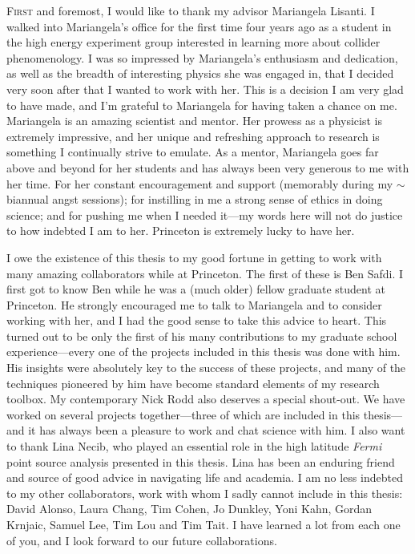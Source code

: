 \lettrine[lines=3]{F}{irst} and foremost, I would like to thank my advisor Mariangela Lisanti. I walked into Mariangela's office for the first time four years ago as a student in the high energy experiment group interested in learning more about collider phenomenology. I was so impressed by Mariangela's enthusiasm and dedication, as well as the breadth of interesting physics she was engaged in, that I decided very soon after that I wanted to work with her. This is a decision I am very glad to have made, and I'm grateful to Mariangela for having taken a chance on me. Mariangela is an amazing scientist and mentor. Her prowess as a physicist is extremely impressive, and her unique and refreshing approach to research is something I continually strive to emulate. As a mentor, Mariangela goes far above and beyond for her students and has always been very generous to me with her time. For her constant encouragement and support (memorably during my $\sim$biannual angst sessions); for instilling in me a strong sense of ethics in doing science; and for pushing me when I needed it---my words here will not do justice to how indebted I am to her. Princeton is extremely lucky to have her.

I owe the existence of this thesis to my good fortune in getting to work with many amazing collaborators while at Princeton. The first of these is Ben Safdi. I first got to know Ben while he was a (much older) fellow graduate student at Princeton. He strongly encouraged me to talk to Mariangela and to consider working with her, and I had the good sense to take this advice to heart. This turned out to be only the first of his many contributions to my graduate school experience---every one of the projects included in this thesis was done with him. His insights were absolutely key to the success of these projects, and many of the techniques pioneered by him have become standard elements of my research toolbox. My contemporary Nick Rodd also deserves a special shout-out. We have worked on several projects together---three of which are included in this thesis---and it has always been a pleasure to work and chat science with him. I also want to thank Lina Necib, who played an essential role in the high latitude \emph{Fermi} point source analysis presented in this thesis. Lina has been an enduring friend and source of good advice in navigating life and academia. I am no less indebted to my other collaborators, work with whom I sadly cannot include in this thesis: David Alonso, Laura Chang, Tim Cohen, Jo Dunkley, Yoni Kahn, Gordan Krnjaic, Samuel Lee, Tim Lou and Tim Tait. I have learned a lot from each one of you, and I look forward to our future collaborations. 

